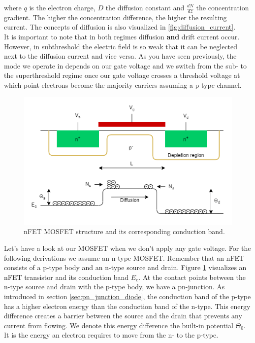 where $q$ is the electron charge, $D$ the diffusion constant and $\frac{dN}{dz}$ the concentration gradient. The higher the concentration difference, the higher the resulting current. The concepts of diffusion is also visualized in \ref{fig:diffusion_current}.\\

It is important to note that in both regimes diffusion \textbf{and} drift current occur. However, in subthreshold the electric field is so weak that it can be neglected next to the diffusion current and vice versa. As you have seen previously, the mode we operate in depends on our gate voltage and we switch from the sub- to the superthreshold regime once our gate voltage crosses a threshold voltage at which point electrons become the majority carriers assuming a p-type channel.\\

\begin{figure}
    \centering
    \includegraphics[width=.8\linewidth]{Figures/subthreshold_diffusion_energy.png}
    \caption{nFET MOSFET structure and its corresponding conduction band.}
    \label{fig:nfet_diffusion_energy}
\end{figure}

Let's have a look at our MOSFET when we don't apply any gate voltage. For the following derivations we assume an n-type MOSFET. Remember that an nFET consists of a p-type body and an n-type source and drain. Figure \ref{fig:nfet_diffusion_energy} visualizes an nFET transistor and its conduction band $E_c$. At the contact points between the n-type source and drain with the p-type body, we have a pn-junction. As introduced in section \ref{sec:pn_junction_diode}, the conduction band of the p-type has a higher electron energy than the conduction band of the n-type. This energy difference creates a barrier between the source and the drain that prevents any current from flowing. We denote this energy difference the built-in potential $\Theta_0$. It is the energy an electron requires to move from the n- to the p-type.\\

